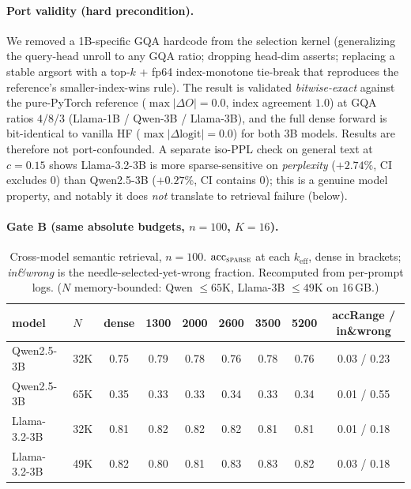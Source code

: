 \documentclass[11pt]{article}
\newcommand{\keff}{k_{\mathrm{eff}}}
\begin{document}
\paragraph{Port validity (hard precondition).}
We removed a 1B-specific GQA hardcode from the selection kernel (generalizing the
query-head unroll to any GQA ratio; dropping head-dim asserts; replacing a stable
argsort with a top-$k$ + fp64 index-monotone tie-break that reproduces the
reference's smaller-index-wins rule). The result is validated \emph{bitwise-exact}
against the pure-PyTorch reference ($\max|\Delta O|=0.0$, index agreement $1.0$) at
GQA ratios $4$/$8$/$3$ (Llama-1B / Qwen-3B / Llama-3B), and the full dense forward is
bit-identical to vanilla HF ($\max|\Delta\text{logit}|=0.0$) for both 3B models.
Results are therefore not port-confounded. A separate iso-PPL check on general text
at $c{=}0.15$ shows Llama-3.2-3B is more sparse-sensitive on \emph{perplexity}
($+2.74\%$, CI excludes $0$) than Qwen2.5-3B ($+0.27\%$, CI contains $0$); this is a
genuine model property, and notably it does \emph{not} translate to retrieval
failure (below).

\paragraph{Gate B (same absolute budgets, $n{=}100$, $K{=}16$).}
\begin{table}[t]
\centering
\small
\caption{Cross-model semantic retrieval, $n{=}100$. $\mathrm{acc}_{\textsc{sparse}}$
at each $\keff$, dense in brackets; \emph{in\&wrong} is the needle-selected-yet-wrong
fraction. Recomputed from per-prompt logs. ($N$ memory-bounded: Qwen $\le 65\mathrm{K}$,
Llama-3B $\le 49\mathrm{K}$ on 16\,GB.)}
\label{tab:cross}
\begin{tabular}{llccccccc}
\toprule
model & $N$ & dense & 1300 & 2000 & 2600 & 3500 & 5200 & accRange / in\&wrong\\
\midrule
Qwen2.5-3B   & 32K & 0.75 & 0.79 & 0.78 & 0.76 & 0.78 & 0.76 & 0.03 / 0.23\\
Qwen2.5-3B   & 65K & 0.35 & 0.33 & 0.33 & 0.34 & 0.33 & 0.34 & 0.01 / 0.55\\
Llama-3.2-3B & 32K & 0.81 & 0.82 & 0.82 & 0.82 & 0.81 & 0.81 & 0.01 / 0.18\\
Llama-3.2-3B & 49K & 0.82 & 0.80 & 0.81 & 0.83 & 0.83 & 0.82 & 0.03 / 0.18\\
\bottomrule
\end{tabular}
\end{table}
\end{document}
